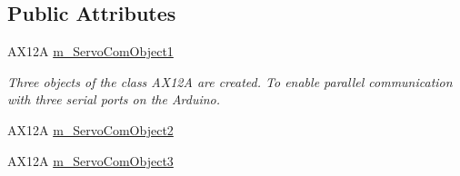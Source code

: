 \subsection*{Public Attributes}
\textbf{ }\par
\begin{DoxyCompactItemize}
\item 
A\+X12A \mbox{\hyperlink{class_movement_controller_ac4642ac20e0affff60ff0b8c0e5efdbb}{m\+\_\+\+Servo\+Com\+Object1}}
\begin{DoxyCompactList}\small\item\em Three objects of the class A\+X12A are created. To enable parallel communication with three serial ports on the Arduino. \end{DoxyCompactList}\item 
A\+X12A \mbox{\hyperlink{class_movement_controller_abd74aff807ff311c6891311414ae3993}{m\+\_\+\+Servo\+Com\+Object2}}
\item 
A\+X12A \mbox{\hyperlink{class_movement_controller_afbe7c5a0e099b5e879d64b6ab72f7127}{m\+\_\+\+Servo\+Com\+Object3}}
\end{DoxyCompactItemize}

